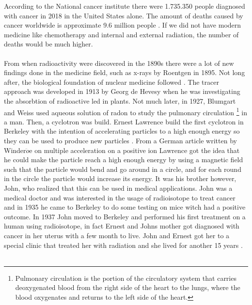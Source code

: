 \documentclass[twoside,english]{uiofysmaster/uiofysmaster}
\begin{document}
According to the National cancer institute \cite{history_medicine} there were 1.735.350 people diagnosed with cancer in 2018 in the United States alone. The amount of deaths caused by cancer worldwide is approximate 9.6 million people \cite{WHO}. If we did not have modern medicine like chemotherapy and internal and external radiation, the number of deaths would be much higher. 
\\
\\
From when radioactivity were discovered in the 1890s there were a lot of new findings done in the medicine field, such as x-rays by Roentgen in 1895. Not long after, the biological foundation of nuclear medicine followed \cite{Cherry2012_chap1}. The tracer approach was developed in 1913 by Georg de Hevesy \cite{Hevesy2014} when he was investigating the absorbtion of radioactive led in plants. Not much later, in 1927, Blumgart and Weiss \cite{Blumgart1927} used aqueous solution of radon to study the pulmonary circulation \footnote{Pulmonary circulation is the portion of the circulatory system that carries deoxygenated blood from the right side of the heart to the lungs, where the blood oxygenates and returns to the left side of the heart.} in a man. Then, a cyclotron was build. Ernest Lawrence build the first cyclotron in Berkeley with the intention of accelerating particles to a high enough energy so they can be used to produce new particles \cite{E.Lawrence}. From a German article written by Winder$\ddot{o}$e on multiple acceleration on a positive ion Lawrence got the idea that he could make the particle reach a high enough energy by using a magnetic field such that the particle would bend and go around in a circle, and for each round in the circle the particle would increase its energy. It was his brother however, John, who realized that this can be used in medical applications. John was a medical doctor and was interested in the usage of radioisotope to treat cancer and in 1935 he came to Berkeley to do some testing on mice witch had a positive outcome. In 1937 John moved to Berkeley and performed his first treatment on a human using radioisotope, in fact Ernest and Johns mother got diagnosed with cancer in her uterus with a few month to live. John and Ernest got her to a special clinic that treated her with radiation and she lived for another 15 years \cite{E.Lawrence}. 
\\
\\
\end{document}
